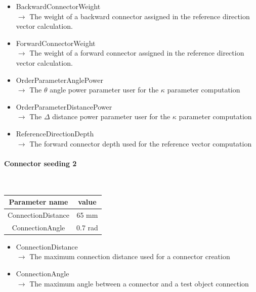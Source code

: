 \documentclass[cits]{JINST}
\begin{document}
\begin{itemize}
  \item BackwardConnectorWeight \\
  $\rightarrow$ The weight of a backward connector assigned in the reference direction vector calculation.
  \item ForwardConnectorWeight \\
  $\rightarrow$ The weight of a forward connector assigned in the reference direction vector calculation.
  \item OrderParameterAnglePower \\
  $\rightarrow$ The $\theta$ angle power parameter user for the $\kappa$ parameter computation
  \item OrderParameterDistancePower \\
  $\rightarrow$ The $\Delta$ distance power parameter user for the $\kappa$ parameter computation
  \item ReferenceDirectionDepth \\
  $\rightarrow$ The forward connector depth used for the reference vector computation
\end{itemize}


\paragraph{Connector seeding 2} ~

\begin{table}[!ht]
  \begin{center}
    \begin{tabu} to \linewidth { c | c } 
          Parameter name & value \\
          \hline
          ConnectionDistance & 65 mm \\
          ConnectionAngle & 0.7 rad
    \end{tabu} 
  \end{center}
\end{table}

\begin{itemize}
  \item ConnectionDistance \\
  $\rightarrow$ The maximum connection distance used for a connector creation
  \item ConnectionAngle \\
  $\rightarrow$ The maximum angle between a connector and a test object connection
\end{itemize}
\end{document}
